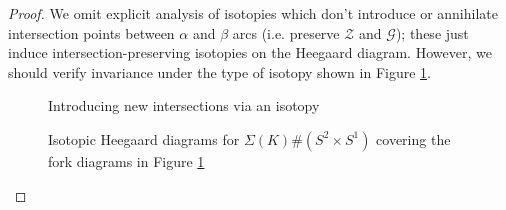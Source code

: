 \documentclass[11pt]{article}
\theoremstyle{plain} \newtheorem{thm}{Theorem}[subsection]
\theoremstyle{plain} \newtheorem{cor}[thm]{Corollary}
\theoremstyle{plain} \newtheorem{prop}[thm]{Proposition}
\theoremstyle{plain} \newtheorem{conj}[thm]{Conjecture}
\theoremstyle{plain} \newtheorem{lem}[thm]{Lemma}
\theoremstyle{definition} \newtheorem{df}[thm]{Definition}
\theoremstyle{remark} \newtheorem{rmk}[thm]{Remark}
\theoremstyle{remark} \newtheorem{obs}[thm]{Observation}
\newcommand{\DBCs}[1]{\Sigma(#1)\#(S^{2}\times S^{1})}
\newcommand{\Zcal}{\mathcal{Z}}
\newcommand{\G}{\mathcal{G}}
\begin{document}
\begin{proof}
We omit explicit analysis of isotopies which don't introduce or annihilate intersection points between $\alpha$ and $\beta$ arcs (i.e. preserve $\Zcal$ and $\G$); these just induce intersection-preserving isotopies on the Heegaard diagram.  However, we should verify invariance under the type of isotopy shown in Figure \ref{fig:isotopy}.

\begin{figure}[h!]
\centering
{}\qquad
{}
\caption{Introducing new intersections via an isotopy
\label{fig:isotopy}}
\end{figure}

\begin{figure}[h!]
\centering
{}\qquad
{}
\caption[Heegaard diagram isotopy induced by fork diagram isotopy]{Isotopic Heegaard diagrams for $\DBCs{K}$ covering the fork diagrams in Figure \ref{fig:isotopy} \label{fig:isotopyhd}}
\end{figure}


\end{proof}
\end{document}
